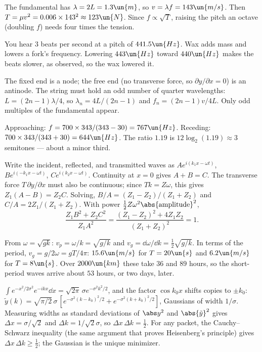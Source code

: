 
 The fundamental has $\lambda = 2L = 1.3\un{m}$, so $v = \lambda f = 143\un{m/s}$. Then $T = \mu v^2 = 0.006\times143^2\approx123\un{N}$. Since $f\propto\sqrt T$, raising the pitch an octave (doubling $f$) needs four times the tension.

 You hear $3$ beats per second at a pitch of $441.5\un{Hz}$. Wax adds mass and lowers a fork's frequency. Lowering $443\un{Hz}$ toward $440\un{Hz}$ makes the beats slower, as observed, so the wax lowered it.

 The fixed end is a node; the free end (no transverse force, so $\partial y/\partial x = 0$) is an antinode. The string must hold an odd number of quarter wavelengths: $L = (2n-1)\lambda/4$, so $\lambda_n = 4L/(2n-1)$ and $f_n = (2n-1)v/4L$. Only odd multiples of the fundamental appear.

 Approaching: $f = 700\times343/(343-30) = 767\un{Hz}$. Receding: $700\times343/(343+30) = 644\un{Hz}$. The ratio $1.19$ is $12\log_2(1.19)\approx3$ semitones --- about a minor third.

 Write the incident, reflected, and transmitted waves as $Ae^{i(k_1x-\omega t)}$, $Be^{i(-k_1x-\omega t)}$, $Ce^{i(k_2x-\omega t)}$. Continuity at $x=0$ gives $A + B = C$. The transverse force $T\,\partial y/\partial x$ must also be continuous; since $Tk = Z\omega$, this gives $Z_1(A-B) = Z_2C$. Solving, $B/A = (Z_1-Z_2)/(Z_1+Z_2)$ and $C/A = 2Z_1/(Z_1+Z_2)$. With power $\tfrac12Z\omega^2\abs{\text{amplitude}}^2$,
\[
  \frac{Z_1B^2 + Z_2C^2}{Z_1A^2} = \frac{(Z_1-Z_2)^2 + 4Z_1Z_2}{(Z_1+Z_2)^2} = 1 .
\]

 From $\omega = \sqrt{gk}$: $v_p = \omega/k = \sqrt{g/k}$ and $v_g = \dd\omega/\dd k = \tfrac12\sqrt{g/k}$. In terms of the period, $v_g = g/2\omega = gT/4\pi$: $15.6\un{m/s}$ for $T = 20\un{s}$ and $6.2\un{m/s}$ for $T = 8\un{s}$. Over $2000\un{km}$ these take $36$ and $89$ hours, so the short-period waves arrive about $53$ hours, or two days, later.

 $\int e^{-x^2/2\sigma^2}e^{-ikx}\dd x = \sqrt{2\pi}\,\sigma e^{-\sigma^2k^2/2}$, and the factor $\cos k_0x$ shifts copies to $\pm k_0$: $\tilde y(k) = \sqrt{\pi/2}\,\sigma\,[e^{-\sigma^2(k-k_0)^2/2} + e^{-\sigma^2(k+k_0)^2/2}]$, Gaussians of width $1/\sigma$. Measuring widths as standard deviations of $\abs y^2$ and $\abs{\tilde y}^2$ gives $\Delta x = \sigma/\sqrt2$ and $\Delta k = 1/\sqrt2\sigma$, so $\Delta x\,\Delta k = \tfrac12$. For any packet, the Cauchy--Schwarz inequality (the same argument that proves Heisenberg's principle) gives $\Delta x\,\Delta k\ge\tfrac12$; the Gaussian is the unique minimizer.

